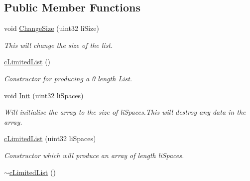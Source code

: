 \subsection*{Public Member Functions}
\begin{DoxyCompactItemize}
\item 
\hypertarget{classc_limited_list_ad909f4fc3256bfa9bc83b9baef8cac80}{
void \hyperlink{classc_limited_list_ad909f4fc3256bfa9bc83b9baef8cac80}{ChangeSize} (uint32 liSize)}
\label{classc_limited_list_ad909f4fc3256bfa9bc83b9baef8cac80}

\begin{DoxyCompactList}\small\item\em This will change the size of the list. \end{DoxyCompactList}\item 
\hypertarget{classc_limited_list_a56cdd868a5924449791625ed2e462b03}{
\hyperlink{classc_limited_list_a56cdd868a5924449791625ed2e462b03}{cLimitedList} ()}
\label{classc_limited_list_a56cdd868a5924449791625ed2e462b03}

\begin{DoxyCompactList}\small\item\em Constructor for producing a 0 length List. \end{DoxyCompactList}\item 
\hypertarget{classc_limited_list_a29c4134a24a54d2d57498bb67447446e}{
void \hyperlink{classc_limited_list_a29c4134a24a54d2d57498bb67447446e}{Init} (uint32 liSpaces)}
\label{classc_limited_list_a29c4134a24a54d2d57498bb67447446e}

\begin{DoxyCompactList}\small\item\em Will initialise the array to the size of liSpaces.This will destroy any data in the array. \end{DoxyCompactList}\item 
\hypertarget{classc_limited_list_ae7c757c09f497da319f989e2042d488f}{
\hyperlink{classc_limited_list_ae7c757c09f497da319f989e2042d488f}{cLimitedList} (uint32 liSpaces)}
\label{classc_limited_list_ae7c757c09f497da319f989e2042d488f}

\begin{DoxyCompactList}\small\item\em Constructor which will produce an array of length liSpaces. \end{DoxyCompactList}\item 
\hypertarget{classc_limited_list_ab7b63990b25112ae8cbf877b4fce7eed}{
\hyperlink{classc_limited_list_ab7b63990b25112ae8cbf877b4fce7eed}{$\sim$cLimitedList} ()}
\label{classc_limited_list_ab7b63990b25112ae8cbf877b4fce7eed}


\end{DoxyCompactItemize}
